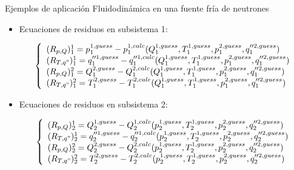 \begin{frame}
{Ejemplos de aplicación}
{Fluidodinámica en una fuente fría de neutrones}

\begin{itemize}
\item Ecuaciones de residuos en subsistema 1:

\begin{equation*}
\left\{ \begin{array}{l}
(R_{p,Q})_{1}^{1}  = p_1^{1, guess} - p_1^{1, calc}(Q_1^{1, guess}, T_1^{1, guess}, p_1^{2, guess}, q_1''^{2, guess}) \\
(R_{T,q"})_{1}^{1} = q_{1}''^{1, guess} - q_{1}''^{1, calc}(Q_1^{1, guess}, T_1^{1, guess}, p_1^{2, guess}, q_1''^{2, guess}) \\
(R_{p,Q})_{1}^{2}  = Q_1^{2, guess} - Q_1^{2, calc}(Q_1^{1, guess}, T_1^{1, guess}, p_1^{2, guess}, q_1''^{2, guess}) \\
(R_{T,q"})_{1}^{2} = T_1^{2, guess} - T_1^{2, calc}(Q_1^{1, guess}, T_1^{1, guess}, p_1^{2, guess}, q_1''^{2, guess})
\end{array}
\right.
\label{residuos-1}
\end{equation*}

\item <2-> Ecuaciones de residuos en subsistema 2:

\begin{equation*}
\left\{ \begin{array}{l}
(R_{p,Q})_{2}^{1}  = Q_2^{1, guess} - Q_2^{1, calc}(p_2^{1, guess}, T_2^{1, guess}, p_2^{2, guess}, q_2''^{2, guess}) \\
(R_{T,q"})_{2}^{1} = q_{2}''^{1, guess} - q_{2}''^{1, calc}(p_2^{1, guess}, T_2^{1, guess}, p_2^{2, guess}, q_2''^{2, guess}) \\
(R_{p,Q})_{2}^{2}  = Q_2^{2, guess} - Q_2^{2, calc}(p_2^{1, guess}, T_2^{1, guess}, p_2^{2, guess}, q_2''^{2, guess})  \\
(R_{T,q"})_{2}^{2} = T_2^{2, guess} - T_2^{2, calc}(p_2^{1, guess}, T_2^{1, guess}, p_2^{2, guess}, q_2''^{2, guess}) 
\end{array}
\right.
\label{residuos-2}
\end{equation*}

\end{itemize}

\end{frame}

